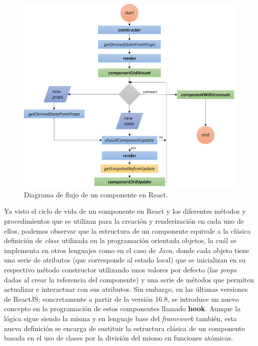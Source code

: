 \documentclass[../main.tex]{subfiles}
\begin{document}
    \begin{figure}[!h]
        \centering
        \includegraphics[width=\textwidth]{images/react_component_lifecycle_flu.png}
        \caption{Diagrama de flujo de un componente en React.}
        \label{fig::react_component_lifecycles_flu}
    \end{figure}
    
    Ya visto el ciclo de vida de un componente en React y los diferentes métodos y procedimientos que se utilizan para la creación y renderización en cada uno de ellos, podemos observar que la estructura de un componente equivale a la clásica definición de \textit{clase} utilizada en la programación orientada objetos, la cuál se implementa en otros lenguajes como en el caso de \textit{Java}, donde cada objeto tiene una serie de atributos (que corresponde al estado local) que se inicializan en su respectivo método constructor utilizando unos valores por defecto (las \textit{props} dadas al crear la referencia del componente) y una serie de métodos que permiten actualizar e interactuar con sus atributos. Sin embargo, en las últimas versiones de ReactJS; concretamente a partir de la versión 16.8, se introduce un nuevo concepto en la programación de estos componentes llamado \textbf{hook}. Aunque la lógica sigue siendo la misma y en lenguaje base del \textit{framework} también, esta nueva definición se encarga de sustituir la estructura clásica de un componente basada en el uso de clases por la división del mismo en funciones atómicas. 
    
\end{document}
